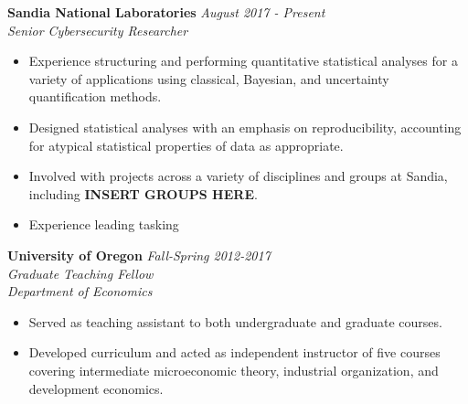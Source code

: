 \documentclass[11pt]{article}
\newenvironment{changemargin}[2]{%
  \begin{list}{}{%
    \setlength{\topsep}{0pt}%
    \setlength{\leftmargin}{#1}%
    \setlength{\rightmargin}{#2}%
    \setlength{\listparindent}{\parindent}%
    \setlength{\itemindent}{\parindent}%
    \setlength{\parsep}{\parskip}%
  }%
  \item[]}{\end{list}
}
\newenvironment{body} {
	\vspace*{-16pt}
	\begin{changemargin}{-0.25in}{-0.5in}
  }	
	{\end{changemargin}
}
\begin{document}
\begin{body}
	\vspace{14pt}
	
	\textbf{Sandia National Laboratories} \hfill \emph{August 2017 - Present}\\
	\emph{Senior Cybersecurity Researcher}\\
	\vspace*{-4pt}
	\begin{itemize}
		\item Experience structuring and performing quantitative statistical analyses for a variety of applications using classical, Bayesian, and uncertainty quantification methods. 
		\item Designed statistical analyses with an emphasis on reproducibility, accounting for atypical statistical properties of data as appropriate. 
		\item Involved with projects across a variety of disciplines and groups at Sandia, including \textbf{INSERT GROUPS HERE}.
		\item Experience leading tasking 
	\end{itemize}	
	
	
	\textbf{University of Oregon} \hfill \emph{Fall-Spring 2012-2017}\\
	\emph{Graduate Teaching Fellow}\\
	\emph{Department of Economics}
	\vspace*{-4pt}
	\begin{itemize}
		\item Served as teaching assistant to both undergraduate and graduate courses.
		\item Developed curriculum and acted as independent instructor of five courses covering intermediate microeconomic theory, industrial organization, and development economics.
	\end{itemize}	
				
\end{body}
\vspace{-9pt}
\smallskip
\end{document}
